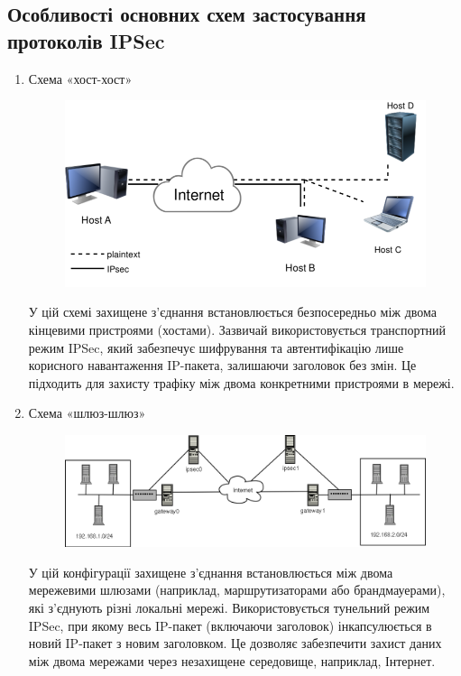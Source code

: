 \subsection{Особливості основних схем застосування протоколів IPSec}
\begin{enumerate}
    \item Схема «хост-хост»
        \begin{figure}[h!]
            \centering
            \includegraphics[scale=0.45]{IMAGES/host-to-host.png}
            \label{fig_pacman}
        \end{figure}
    \par У цій схемі захищене з'єднання встановлюється безпосередньо між двома кінцевими пристроями (хостами). Зазвичай використовується транспортний режим IPSec, який забезпечує шифрування та автентифікацію лише корисного навантаження IP-пакета, залишаючи заголовок без змін. Це підходить для захисту трафіку між двома конкретними пристроями в мережі.
    
    \item Схема «шлюз-шлюз»
        \begin{figure}[h!]
            \centering
            \includegraphics[scale=0.45]{IMAGES/net-to-net.png}
            \label{fig_pacman}
        \end{figure}
    \par У цій конфігурації захищене з'єднання встановлюється між двома мережевими шлюзами (наприклад, маршрутизаторами або брандмауерами), які з'єднують різні локальні мережі. Використовується тунельний режим IPSec, при якому весь IP-пакет (включаючи заголовок) інкапсулюється в новий IP-пакет з новим заголовком. Це дозволяє забезпечити захист даних між двома мережами через незахищене середовище, наприклад, Інтернет.


\end{enumerate}
